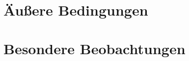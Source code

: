 \section{Äußere Bedingungen} \label{sec:external-conditions}

\lipsum[1]

\section{Besondere Beobachtungen} \label{sec:special-observations}

\lipsum[1]